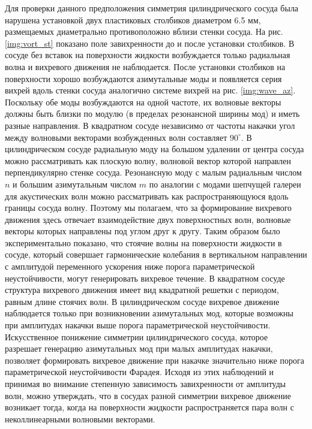 Для проверки данного предположения симметрия цилиндрического сосуда была нарушена установкой двух пластиковых столбиков диаметром 6.5 мм, размещаемых диаметрально противоположно вблизи стенки сосуда. На рис. \ref{img:vort_st} показано поле завихренности до и после установки столбиков. В сосуде без вставок на поверхности жидкости возбуждается только радиальная волна и вихревого движения не наблюдается. После установки столбиков на поверхности хорошо возбуждаются азимутальные моды и появляется серия вихрей вдоль стенки сосуда аналогично системе вихрей на рис. \ref{img:wave_az}. Поскольку обе моды возбуждаются на одной частоте, их волновые векторы должны быть близки по модулю (в пределах резонансной ширины мод) и иметь разные направления. В квадратном сосуде независимо от частоты накачки угол между волновыми векторами возбужденных волн составляет $90^\circ$. В цилиндрическом сосуде радиальную моду на большом удалении от центра сосуда можно рассматривать как плоскую волну, волновой вектор которой направлен перпендикулярно стенке сосуда. Резонансную моду с малым радиальным числом $n$ и большим азимутальным числом $m$ по аналогии с модами шепчущей галереи для акустических волн можно рассматривать как распространяющуюся вдоль границы сосуда волну. Поэтому мы полагаем, что за формирование вихревого движения здесь отвечает взаимодействие двух поверхностных волн, волновые векторы которых направлены под углом друг к другу.
Таким образом было экспериментально показано, что стоячие волны на поверхности жидкости в сосуде, который совершает гармонические колебания в вертикальном направлении с амплитудой переменного ускорения ниже порога параметрической неустойчивости, могут генерировать вихревое течение. В квадратном сосуде структура вихревого движения имеет вид квадратной решетки с периодом, равным длине стоячих волн. В цилиндрическом сосуде вихревое движение наблюдается только при возникновении азимутальных мод, которые возможны при амплитудах накачки выше порога параметрической неустойчивости. Искусственное понижение симметрии цилиндрического сосуда, которое разрешает генерацию азимутальных мод при малых амплитудах накачки, позволяет формировать вихревое движение при накачке значительно ниже порога параметрической неустойчивости Фарадея. Исходя из этих наблюдений и принимая во внимание степенную зависимость завихренности от амплитуды волн, можно утверждать, что в сосудах разной симметрии вихревое движение возникает тогда, когда на поверхности жидкости распространяется пара волн с неколлинеарными волновыми векторами.

